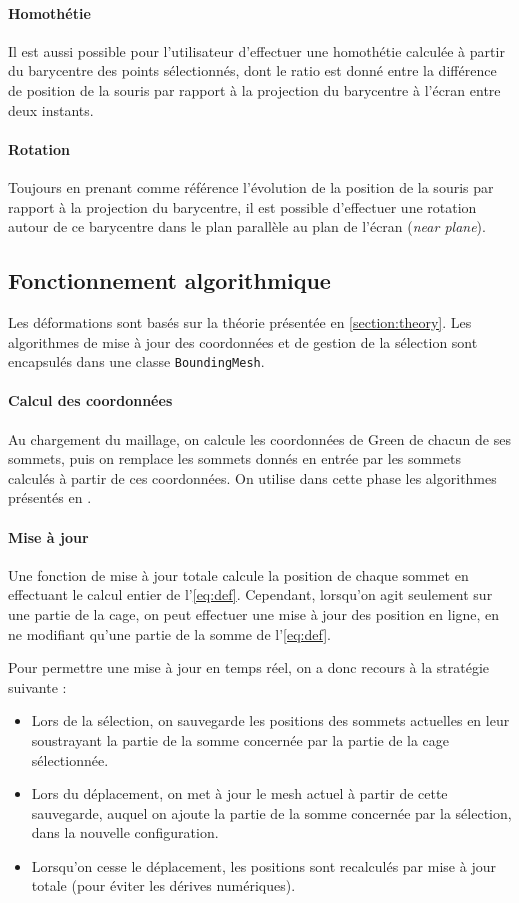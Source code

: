 \documentclass[10pt,a4paper]{article}
\begin{document}
\paragraph{Homothétie}Il est aussi possible pour l'utilisateur d'effectuer une homothétie calculée à partir du barycentre des points sélectionnés, dont le ratio est donné entre la différence de position de la souris par rapport à la projection du barycentre à l'écran entre deux instants.

\paragraph{Rotation}Toujours en prenant comme référence l'évolution de la position de la souris par rapport à la projection du barycentre, il est possible d'effectuer une rotation autour de ce barycentre dans le plan parallèle au plan de l'écran (\textit{near plane}).

\subsection{Fonctionnement algorithmique}

Les déformations sont basés sur la théorie présentée en \autoref{section:theory}. Les algorithmes de mise à jour des coordonnées et de gestion de la sélection sont encapsulés dans une classe \texttt{BoundingMesh}.

\paragraph{Calcul des coordonnées}Au chargement du maillage, on calcule les coordonnées de Green de chacun de ses sommets, puis on remplace les sommets donnés en entrée par les sommets calculés à partir de ces coordonnées. On utilise dans cette phase les algorithmes présentés en \cite{lipman2008green}.

\paragraph{Mise à jour}Une fonction de mise à jour totale calcule la position de chaque sommet en effectuant le calcul entier de l'\autoref{eq:def}. Cependant, lorsqu'on agit seulement sur une partie de la cage, on peut effectuer une mise à jour des position en ligne, en ne modifiant qu'une partie de la somme de l'\autoref{eq:def}.

Pour permettre une mise à jour en temps réel, on a donc recours à la stratégie suivante :
\begin{itemize}
\item Lors de la sélection, on sauvegarde les positions des sommets actuelles en leur soustrayant la partie de la somme concernée par la partie de la cage sélectionnée.
\item Lors du déplacement, on met à jour le mesh actuel à partir de cette sauvegarde, auquel on ajoute la partie de la somme concernée par la sélection, dans la nouvelle configuration.
\item Lorsqu'on cesse le déplacement, les positions sont recalculés par mise à jour totale (pour éviter les dérives numériques).
\end{itemize}
\end{document}
